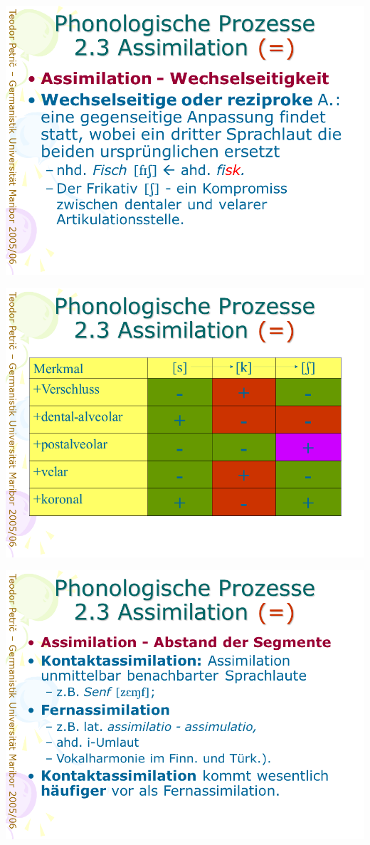 \documentclass[
  letterpaper,
]{scrbook}
\begin{document}
\includegraphics[width=1\textwidth,height=\textheight]{./pictures/prozesse/prozesse_39.PNG}

\includegraphics[width=1\textwidth,height=\textheight]{./pictures/prozesse/prozesse_40.PNG}

\includegraphics[width=1\textwidth,height=\textheight]{./pictures/prozesse/prozesse_41.PNG}
\end{document}
